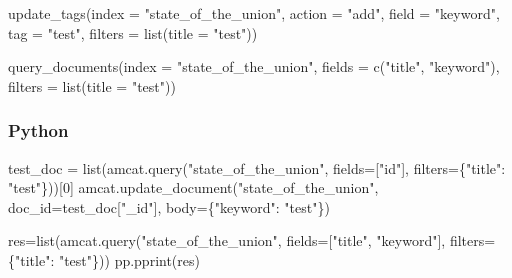 \documentclass[
  letterpaper,
  DIV=11,
  numbers=noendperiod]{scrreprt}
\newenvironment{Shaded}{\begin{snugshade}}{\end{snugshade}}
\newcommand{\AttributeTok}[1]{\textcolor[rgb]{0.40,0.45,0.13}{#1}}
\newcommand{\BuiltInTok}[1]{\textcolor[rgb]{0.00,0.23,0.31}{#1}}
\newcommand{\DecValTok}[1]{\textcolor[rgb]{0.68,0.00,0.00}{#1}}
\newcommand{\FunctionTok}[1]{\textcolor[rgb]{0.28,0.35,0.67}{#1}}
\newcommand{\NormalTok}[1]{\textcolor[rgb]{0.00,0.23,0.31}{#1}}
\newcommand{\OperatorTok}[1]{\textcolor[rgb]{0.37,0.37,0.37}{#1}}
\newcommand{\StringTok}[1]{\textcolor[rgb]{0.13,0.47,0.30}{#1}}
\begin{document}
\begin{Shaded}
\begin{Highlighting}[]
\FunctionTok{update\_tags}\NormalTok{(}\AttributeTok{index =} \StringTok{"state\_of\_the\_union"}\NormalTok{, }
            \AttributeTok{action =} \StringTok{"add"}\NormalTok{, }
            \AttributeTok{field =} \StringTok{"keyword"}\NormalTok{, }
            \AttributeTok{tag =} \StringTok{"test"}\NormalTok{, }
            \AttributeTok{filters =} \FunctionTok{list}\NormalTok{(}\AttributeTok{title =} \StringTok{"test"}\NormalTok{))}
\end{Highlighting}
\end{Shaded}

\begin{Shaded}
\begin{Highlighting}[]
\FunctionTok{query\_documents}\NormalTok{(}\AttributeTok{index =} \StringTok{"state\_of\_the\_union"}\NormalTok{, }
                \AttributeTok{fields =} \FunctionTok{c}\NormalTok{(}\StringTok{"title"}\NormalTok{, }\StringTok{"keyword"}\NormalTok{),}
                \AttributeTok{filters =} \FunctionTok{list}\NormalTok{(}\AttributeTok{title =} \StringTok{"test"}\NormalTok{))}
\end{Highlighting}
\end{Shaded}

\subsubsection{Python}

\begin{Shaded}
\begin{Highlighting}[]
\NormalTok{test\_doc }\OperatorTok{=} \BuiltInTok{list}\NormalTok{(amcat.query(}\StringTok{"state\_of\_the\_union"}\NormalTok{, fields}\OperatorTok{=}\NormalTok{[}\StringTok{"id"}\NormalTok{], filters}\OperatorTok{=}\NormalTok{\{}\StringTok{"title"}\NormalTok{: }\StringTok{"test"}\NormalTok{\}))[}\DecValTok{0}\NormalTok{]}
\NormalTok{amcat.update\_document(}\StringTok{"state\_of\_the\_union"}\NormalTok{, doc\_id}\OperatorTok{=}\NormalTok{test\_doc[}\StringTok{"\_id"}\NormalTok{], body}\OperatorTok{=}\NormalTok{\{}\StringTok{"keyword"}\NormalTok{: }\StringTok{"test"}\NormalTok{\})}
\end{Highlighting}
\end{Shaded}

\begin{Shaded}
\begin{Highlighting}[]
\NormalTok{res}\OperatorTok{=}\BuiltInTok{list}\NormalTok{(amcat.query(}\StringTok{"state\_of\_the\_union"}\NormalTok{, fields}\OperatorTok{=}\NormalTok{[}\StringTok{"title"}\NormalTok{, }\StringTok{"keyword"}\NormalTok{], filters}\OperatorTok{=}\NormalTok{\{}\StringTok{"title"}\NormalTok{: }\StringTok{"test"}\NormalTok{\}))}
\NormalTok{pp.pprint(res)}
\end{Highlighting}
\end{Shaded}
\end{document}
